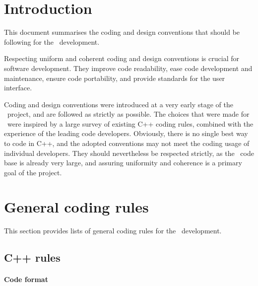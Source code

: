 \documentclass{article}[12pt,a4]
\begin{document}
\frontpage


\section{Introduction}

This document summarises the coding and design conventions that should be following for
the \this\ development.

Respecting uniform and coherent coding and design conventions is crucial for software
development.
They improve code readability, ease code development and maintenance, ensure code
portability, and provide standards for the user interface.

Coding and design conventions were introduced at a very early stage of the \this\ project, and
are followed as strictly as possible.
The choices that were made for \this\ were inspired by a large survey of existing C++ coding
rules, combined with the experience of the leading code developers.
Obviously, there is no single best way to code in C++, and the adopted conventions may not
meet the coding usage of individual developers.
They should nevertheless be respected strictly, as the \this\ code base is already very large,
and assuring uniformity and coherence is a primary goal of the project.


\section{General coding rules}

This section provides lists of general coding rules for the \this\ development.

\subsection{C++ rules}

\paragraph{Code format}
\end{document}
